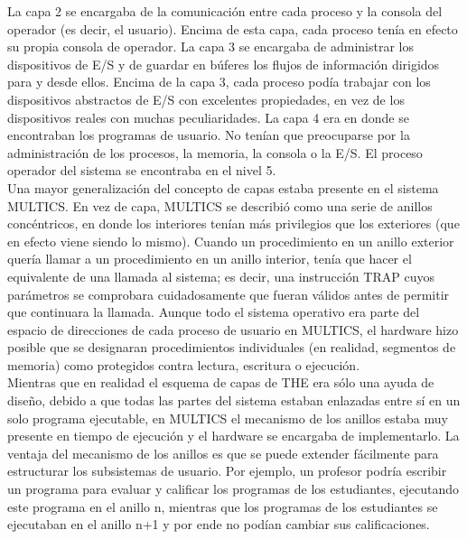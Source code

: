 \documentclass[10pt,a4paper,spanish]{report}
\begin{document}
  \noindent
  La capa 2 se encargaba de la comunicación entre cada proceso y la consola del operador (es decir, el usuario). Encima de esta capa, cada proceso tenía en efecto su propia consola de operador. La capa 3 se encargaba de administrar los dispositivos de E/S y de guardar en búferes los flujos de información dirigidos para y desde ellos. Encima de la capa 3, cada proceso podía trabajar con los dispositivos abstractos de E/S con excelentes propiedades, en vez de los dispositivos reales con muchas peculiaridades. La capa 4 era en donde se encontraban los programas de usuario. No tenían que preocuparse por la administración de los procesos, la memoria, la consola o la E/S. El proceso operador del sistema se encontraba en el nivel 5. \\

  \noindent
  Una mayor generalización del concepto de capas estaba presente en el sistema MULTICS. En vez de capa, MULTICS se describió como una serie de anillos concéntricos, en donde los interiores tenían más privilegios que los exteriores (que en efecto viene siendo lo mismo). Cuando un procedimiento en un anillo exterior quería llamar a un procedimiento en un anillo interior, tenía que hacer el equivalente de una llamada al sistema; es decir, una instrucción TRAP cuyos parámetros se comprobara cuidadosamente que fueran válidos antes de permitir que continuara la llamada. Aunque todo el sistema operativo era parte del espacio de direcciones de cada proceso de usuario en MULTICS, el hardware hizo posible que se designaran procedimientos individuales (en realidad, segmentos de memoria) como protegidos contra lectura, escritura o ejecución. \\

  \noindent
  Mientras que en realidad el esquema de capas de THE era sólo una ayuda de diseño, debido a que todas las partes del sistema estaban enlazadas entre sí en un solo programa ejecutable, en MULTICS el mecanismo de los anillos estaba muy presente en tiempo de ejecución y el hardware se encargaba de implementarlo. La ventaja del mecanismo de los anillos es que se puede extender fácilmente para estructurar los subsistemas de usuario. Por ejemplo, un profesor podría escribir un programa para evaluar y calificar los programas de los estudiantes, ejecutando este programa en el anillo n, mientras que los programas de los estudiantes se ejecutaban en el anillo n+1 y por ende no podían cambiar sus calificaciones.

\end{document}

